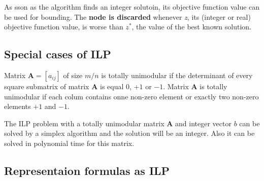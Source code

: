 \documentclass[
  czech,
  a4paperpaper,
]{article}
\begin{document}
As sson as the algorithm finds an integer solutoin, its objective
function value can be used for bounding. The \textbf{node is discarded}
whenever \emph{z}, its (integer or real) objective function value, is
worse than \(z^*\), the value of the best known solution.

\hypertarget{special-cases-of-ilp}{%
\subsection{Special cases of ILP}\label{special-cases-of-ilp}}

Matrix \(\mathbf{A} = [a_{ij}]\) of size \(m/n\) is totally unimodular
if the determinant of every square submatrix of matrix \(\mathbf{A}\) is
equal \(0\), \(+1\) or \(-1\). Matrix \(\mathbf{A}\) is totally
unimodular if each colum contains onne non-zero element or exactly two
non-zero elements \(+1\) and \(-1\).

The ILP problem with a totally unimodular matrix \(\mathbf{A}\) and
integer vector \(b\) can be solved by a simplex algorithm and the
solution will be an integer. Also it can be solved in polynomial time
for this matrix.

\hypertarget{representaion-formulas-as-ilp}{%
\subsection{Representaion formulas as
ILP}\label{representaion-formulas-as-ilp}}
\end{document}
